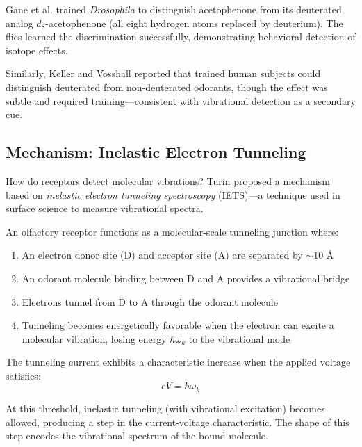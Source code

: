 \begin{example}
Gane et al. \cite{gane2013molecular} trained \textit{Drosophila} to distinguish acetophenone from its deuterated analog $d_8$-acetophenone (all eight hydrogen atoms replaced by deuterium). The flies learned the discrimination successfully, demonstrating behavioral detection of isotope effects.

Similarly, Keller and Vosshall \cite{keller2004human} reported that trained human subjects could distinguish deuterated from non-deuterated odorants, though the effect was subtle and required training—consistent with vibrational detection as a secondary cue.
\end{example}

\subsection{Mechanism: Inelastic Electron Tunneling}

How do receptors detect molecular vibrations? Turin proposed a mechanism based on \textit{inelastic electron tunneling spectroscopy} (IETS)—a technique used in surface science to measure vibrational spectra.

\begin{definition}
\label{def:ietsp}
An olfactory receptor functions as a molecular-scale tunneling junction where:
\begin{enumerate}
\item An electron donor site (D) and acceptor site (A) are separated by $\sim 10$ Å
\item An odorant molecule binding between D and A provides a vibrational bridge
\item Electrons tunnel from D to A through the odorant molecule
\item Tunneling becomes energetically favorable when the electron can excite a molecular vibration, losing energy $\hbar\omega_k$ to the vibrational mode
\end{enumerate}
\end{definition}

The tunneling current exhibits a characteristic increase when the applied voltage satisfies:
\begin{equation}
eV = \hbar\omega_k
\end{equation}

At this threshold, inelastic tunneling (with vibrational excitation) becomes allowed, producing a step in the current-voltage characteristic. The shape of this step encodes the vibrational spectrum of the bound molecule.


